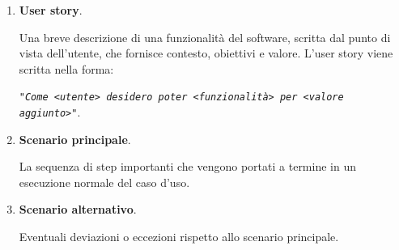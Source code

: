 \begin{enumerate}
    \item \textbf{User story}.
    
    Una breve descrizione di una funzionalità del software, scritta dal punto di vista dell'utente, che fornisce contesto, obiettivi e valore.
    L'user story viene scritta nella forma:
    \begin{center}
        \small
        \texttt{\textit{"Come <utente> desidero poter <funzionalità> per <valore aggiunto>"}}.
    \end{center}

    \item \textbf{Scenario principale}.
    
    La sequenza di step importanti che vengono portati a termine in un esecuzione normale del caso d'uso.
    
    \item \textbf{Scenario alternativo}.

    Eventuali deviazioni o eccezioni rispetto allo scenario principale.
\end{enumerate}

